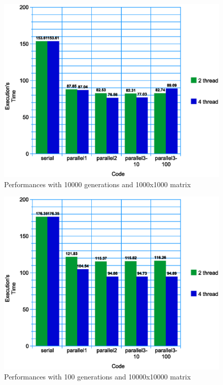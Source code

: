 \documentclass[a4paper,11pt,twoside]{report}
\begin{document}
\begin{figure}
	\centering
	\includegraphics[scale = 0.5]{1000-10000.eps}
	\caption{Performances with 10000 generations and 1000x1000 matrix} \label{fig:5}
\end{figure}
\begin{figure}
	\centering
	\includegraphics[scale = 0.5]{10000-100.eps}
	\caption{Performances with 100 generations and 10000x10000 matrix} \label{fig:6}
\end{figure}
\end{document}
